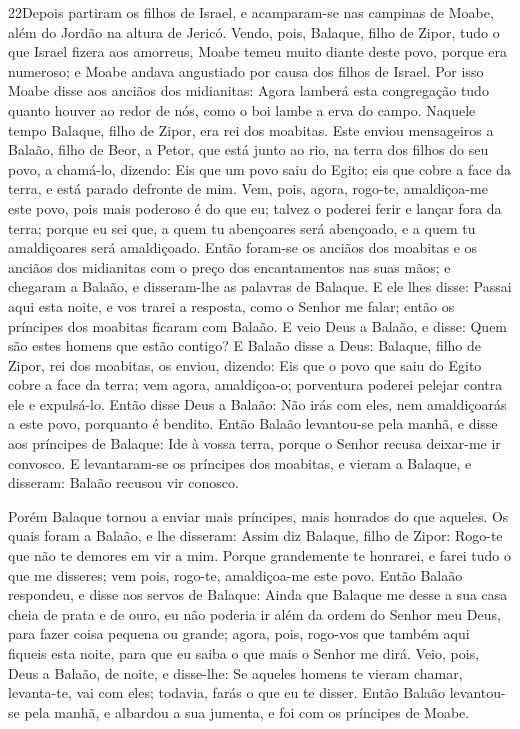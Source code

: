 \medskip

\lettrine{22} Depois partiram os filhos de Israel, e
acamparam-se nas campinas de Moabe, além do Jordão na altura de
Jericó. Vendo, pois, Balaque, filho de Zipor, tudo o que Israel
fizera aos amorreus, Moabe temeu muito diante deste povo, porque
era numeroso; e Moabe andava angustiado por causa dos filhos de
Israel. Por isso Moabe disse aos anciãos dos midianitas: Agora
lamberá esta congregação tudo quanto houver ao redor de nós, como o
boi lambe a erva do campo. Naquele tempo Balaque, filho de Zipor,
era rei dos moabitas. Este enviou mensageiros a Balaão, filho de
Beor, a Petor, que está junto ao rio, na terra dos filhos do seu
povo, a chamá-lo, dizendo: Eis que um povo saiu do Egito; eis que
cobre a face da terra, e está parado defronte de mim. Vem, pois,
agora, rogo-te, amaldiçoa-me este povo, pois mais poderoso é do que
eu; talvez o poderei ferir e lançar fora da terra; porque eu sei
que, a quem tu abençoares será abençoado, e a quem tu amaldiçoares
será amaldiçoado. Então foram-se os anciãos dos moabitas e os
anciãos dos midianitas com o preço dos encantamentos nas suas mãos;
e chegaram a Balaão, e disseram-lhe as palavras de Balaque. E
ele lhes disse: Passai aqui esta noite, e vos trarei a resposta,
como o Senhor me falar; então os príncipes dos moabitas ficaram com
Balaão. E veio Deus a Balaão, e disse: Quem são estes homens que
estão contigo? E Balaão disse a Deus: Balaque, filho de
Zipor, rei dos moabitas, os enviou, dizendo: Eis que o povo
que saiu do Egito cobre a face da terra; vem agora, amaldiçoa-o;
porventura poderei pelejar contra ele e expulsá-lo. Então
disse Deus a Balaão: Não irás com eles, nem amaldiçoarás a este
povo, porquanto é bendito. Então Balaão levantou-se pela
manhã, e disse aos príncipes de Balaque: Ide à vossa terra, porque o
Senhor recusa deixar-me ir convosco. E levantaram-se os
príncipes dos moabitas, e vieram a Balaque, e disseram: Balaão
recusou vir conosco.

Porém Balaque tornou a enviar mais príncipes, mais honrados do
que aqueles. Os quais foram a Balaão, e lhe disseram: Assim
diz Balaque, filho de Zipor: Rogo-te que não te demores em vir a
mim. Porque grandemente te honrarei, e farei tudo o que me
disseres; vem pois, rogo-te, amaldiçoa-me este povo. Então
Balaão respondeu, e disse aos servos de Balaque: Ainda que Balaque
me desse a sua casa cheia de prata e de ouro, eu não poderia ir além
da ordem do Senhor meu Deus, para fazer coisa pequena ou grande;
agora, pois, rogo-vos que também aqui fiqueis esta noite,
para que eu saiba o que mais o Senhor me dirá. Veio, pois,
Deus a Balaão, de noite, e disse-lhe: Se aqueles homens te vieram
chamar, levanta-te, vai com eles; todavia, farás o que eu te disser.
Então Balaão levantou-se pela manhã, e albardou a sua
jumenta, e foi com os príncipes de Moabe.


